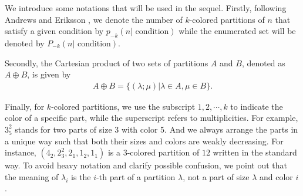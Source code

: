\documentclass[12pt,reqno]{amsart}
\numberwithin{equation}{section}
\theoremstyle{plain}
\theoremstyle{definition}
\begin{document}
We introduce some notations that will be used in the sequel. Firstly, following Andrews and Eriksson \cite{AE2004}, we denote the number of $k$-colored partitions of $n$ that satisfy a given condition by $p_{-k}(n|\textrm{ condition})$ while the enumerated set will be denoted by $P_{-k}(n|\textrm{ condition})$.

Secondly, the Cartesian product of two sets of partitions $A$ and $B$, denoted as $A\oplus B$, is given by
\begin{align*}
A\oplus B=\{(\lambda;\mu)|\lambda\in A,\mu\in B\}.
\end{align*}

Finally, for $k$-colored partitions, we use the subscript $1,2,\cdots,k$ to indicate the color of a specific part, while the superscript refers to multiplicities. For example, $3_{5}^2$ stands for two parts of size 3 with color 5. And we always arrange the parts in a unique way such that both their sizes and colors are weakly decreasing. For instance, $(4_2,2_3^2,2_1,1_2,1_1)$ is a $3$-colored partition of $12$ written in the standard way. To avoid heavy notation and clarify possible confusion, we point out that the meaning of $\lambda_i$ is the $i$-th part of a partition $\lambda$, not a part of size $\lambda$ and color $i$.
\end{document}
